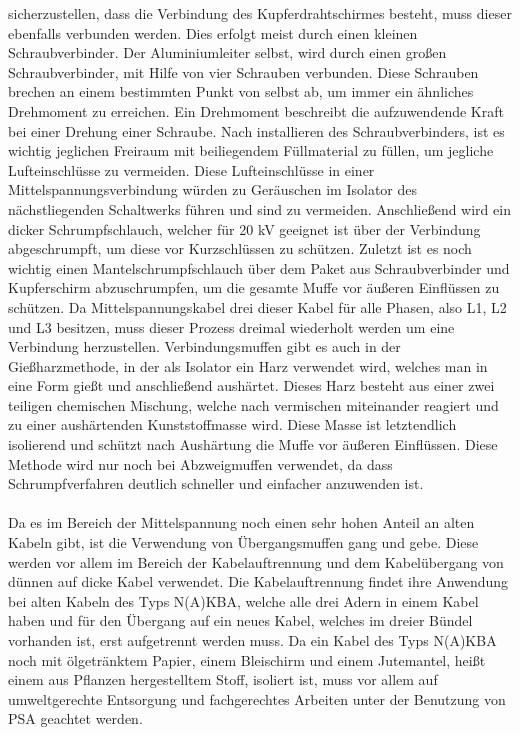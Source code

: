 sicherzustellen, dass die Verbindung des Kupferdrahtschirmes besteht, muss dieser ebenfalls verbunden werden. Dies erfolgt meist durch einen kleinen 
Schraubverbinder. Der Aluminiumleiter selbst, wird durch einen großen Schraubverbinder, mit Hilfe von vier Schrauben verbunden. Diese Schrauben brechen an 
einem bestimmten Punkt von selbst ab, um immer ein ähnliches Drehmoment zu erreichen. Ein Drehmoment beschreibt die aufzuwendende Kraft bei einer Drehung 
einer Schraube. Nach installieren des Schraubverbinders, ist es wichtig jeglichen Freiraum mit beiliegendem Füllmaterial zu füllen, um jegliche 
Lufteinschlüsse zu vermeiden. Diese Lufteinschlüsse in einer Mittelspannungsverbindung würden zu Geräuschen im Isolator des nächstliegenden Schaltwerks 
führen und sind zu vermeiden. Anschließend wird ein dicker Schrumpfschlauch, welcher für 20 kV geeignet ist über der Verbindung abgeschrumpft, um diese 
vor Kurzschlüssen zu schützen. Zuletzt ist es noch wichtig einen Mantelschrumpfschlauch über dem Paket aus Schraubverbinder und Kupferschirm abzuschrumpfen, 
um die gesamte Muffe vor äußeren Einflüssen zu schützen. Da Mittelspannungskabel drei dieser Kabel für alle Phasen, also L1, L2 und L3 besitzen, muss 
dieser Prozess dreimal wiederholt werden um eine Verbindung herzustellen. Verbindungsmuffen gibt es auch in der Gießharzmethode, in der als Isolator ein 
Harz verwendet wird, welches man in eine Form gießt und anschließend aushärtet. Dieses Harz besteht aus einer zwei teiligen chemischen Mischung, welche 
nach vermischen miteinander reagiert und zu einer aushärtenden Kunststoffmasse wird. Diese Masse ist letztendlich isolierend und schützt nach Aushärtung 
die Muffe vor äußeren Einflüssen. Diese Methode wird nur noch bei Abzweigmuffen verwendet, da dass Schrumpfverfahren deutlich schneller und einfacher 
anzuwenden ist.\\\\
Da es im Bereich der Mittelspannung noch einen sehr hohen Anteil an alten Kabeln gibt, ist die Verwendung von Übergangsmuffen gang und gebe. Diese werden 
vor allem im Bereich der Kabelauftrennung und dem Kabelübergang von dünnen auf dicke Kabel verwendet. Die Kabelauftrennung findet ihre Anwendung bei alten 
Kabeln des Typs N(A)KBA, welche alle drei Adern in einem Kabel haben und für den Übergang auf ein neues Kabel, welches im dreier Bündel vorhanden ist, erst 
aufgetrennt werden muss. Da ein Kabel des Typs N(A)KBA noch mit ölgetränktem Papier, einem Bleischirm und einem Jutemantel, heißt einem aus Pflanzen 
hergestelltem Stoff, isoliert ist, muss vor allem auf umweltgerechte Entsorgung und fachgerechtes Arbeiten unter der Benutzung von PSA geachtet werden. 
